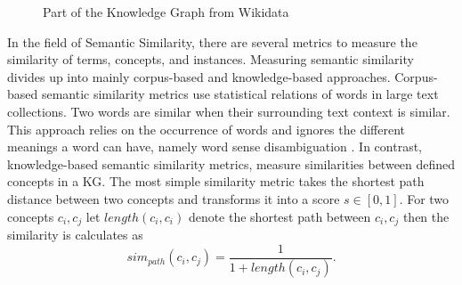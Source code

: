 \documentclass[pdftex,a4paper,12pt]{scrartcl}
\theoremstyle{definition}
\begin{document}
\begin{figure}

    \centering
    \caption{Part of the Knowledge Graph from Wikidata}
    \label{fig:kg}
\end{figure}

In the field of Semantic Similarity, there are several metrics to measure the similarity of terms, concepts, and instances.
Measuring semantic similarity divides up into mainly corpus-based and knowledge-based approaches. Corpus-based semantic similarity metrics use statistical relations of words in large text collections. Two words are similar when their surrounding text context is similar. This approach relies on the occurrence of words and ignores the different meanings a word can have, namely word sense disambiguation \citep{zhu_computing_2017}. 
In contrast, knowledge-based semantic similarity metrics, measure similarities between defined concepts in a KG. The most simple similarity metric takes the shortest path distance between two concepts and transforms it into a score $s \in [0,1]$. For two concepts $c_i,c_j$ let $length(c_i,c_i)$ denote the shortest path between $c_i,c_j$ then the similarity is calculates as 
\begin{equation}
    sim_{path}(c_i,c_j) = \frac{1}{1+length(c_i,c_j)}.
\end{equation}
\end{document}
